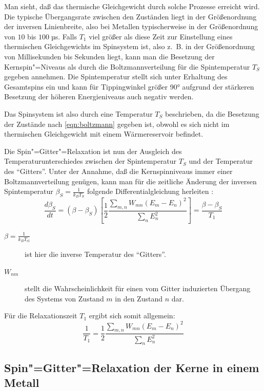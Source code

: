 Man sieht, daß das thermische Gleichgewicht durch solche Prozesse erreicht wird. Die typische
Übergangsrate zwischen den Zuständen liegt in der Größenordnung der inversen Linienbreite, also bei
Metallen typischerweise in der Größenordnung von $10$ bis $100\;$µs. Falls $T_1$ viel größer als
diese Zeit zur Einstellung eines thermischen Gleichgewichts im Spinsystem ist, also z.\ B. in der
Größenordnung von Millisekunden bis Sekunden liegt, kann man die Besetzung der Kernspin"=Niveaus
als durch die Boltzmannverteilung für die Spintemperatur $T_S$ gegeben annehmen. Die Spintemperatur
stellt sich unter Erhaltung des Gesamtspins ein und kann für Tippingwinkel größer 90° aufgrund der
stärkeren Besetzung der höheren Energieniveaus auch negativ werden.

Das Spinsystem ist also durch eine Temperatur $T_S$ beschrieben, da die Besetzung der Zustände nach
\eqref{eqn:boltzmann} gegeben ist, obwohl es sich nicht im thermischen
Gleichgewicht mit einem Wärmereservoir befindet.

Die Spin"=Gitter"=Relaxation ist nun der Ausgleich des Temperaturunterschiedes zwischen der
Spintemperatur $T_S$ und der Temperatur des "`Gitters"'. Unter der Annahme, daß die
Kernspinniveaus immer einer Boltzmannverteilung genügen, kann man für die zeitliche Änderung der
inversen Spintemperatur $\beta_S=\frac1{k_BT_S}$ folgende Differentialgleichung herleiten \cite[S. 148ff]{Slichter}:
	\begin{equation}
		\frac{d\beta_S}{dt}=(\beta-\beta_S)\left[\frac12\frac{\sum_{m,n}W_{mn}(E_m-E_n)^2}{\sum_nE^2_n}\right]
			= \frac{\beta-\beta_S}{T_1}
	\end{equation}
\begin{description}
	\item[$\beta=\frac1{k_BT_\mathrm{el}}$] ist hier die inverse Temperatur des "`Gitters"'.
	\item[$W_{nm}$] stellt die Wahrscheinlichkeit für einen vom Gitter induzierten Übergang des
		Systems von Zustand $m$ in den Zustand $n$ dar.
\end{description}
Für die Relaxationszeit $T_1$ ergibt sich somit allgemein:
	\begin{equation}
		\label{eqn:t1}
		\frac1{T_1}=\frac12\frac{\sum_{m,n}W_{mn}(E_m-E_n)^2}{\sum_nE^2_n}
	\end{equation}

\subsection{Spin"=Gitter"=Relaxation der Kerne in einem Metall}

